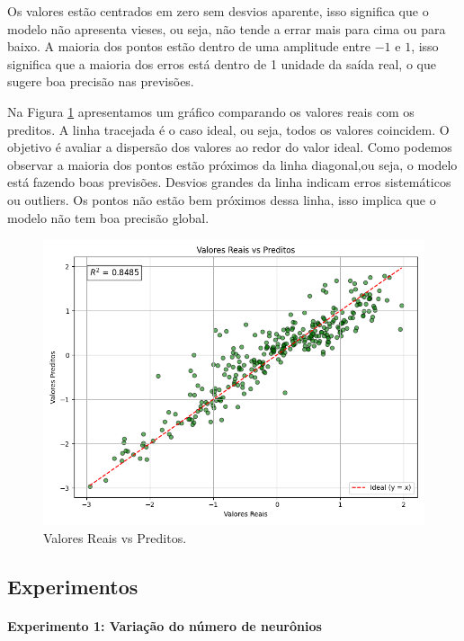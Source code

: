 \documentclass[12pt,a4paper,oneside]{report}
\begin{document}
Os valores estão centrados em zero sem desvios aparente, isso significa que o modelo não apresenta vieses, ou seja, não tende a errar mais para cima ou para baixo. A maioria dos pontos estão dentro de uma amplitude entre $-1$ e $1$, isso significa que a maioria dos erros está dentro de 1 unidade da saída real, o que sugere boa precisão nas previsões.  
	
	
Na Figura \ref{fig:t1valoresreaispreditosleg} apresentamos um gráfico comparando os valores reais com os preditos. A linha tracejada é o caso ideal, ou seja, todos os valores coincidem. O objetivo é avaliar a dispersão dos valores ao redor do valor ideal. Como podemos observar a maioria dos pontos estão próximos da linha diagonal,ou seja, o modelo está fazendo boas previsões. Desvios grandes da linha indicam erros sistemáticos ou outliers. Os pontos não estão bem próximos dessa linha, isso implica que o modelo não tem boa precisão global.
	\begin{figure}[h!]
		\centering
		\includegraphics[width=0.7\linewidth]{img/t1_valores_reais_preditos_leg}
		\caption{Valores Reais vs Preditos.}
		\label{fig:t1valoresreaispreditosleg}
	\end{figure}
	
	\subsection{Experimentos}
	
	\paragraph{Experimento 1: Varia\c{c}\~ao do número de neurônios}
	
\end{document}
